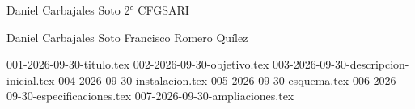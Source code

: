 \documentclass[spanish,openany]{report}
\date{\today}
\begin{document}
{Daniel Carbajales Soto}
{2° CFGSARI}
\setcounter{page}{1}

{Daniel Carbajales Soto}
{Francisco Romero Quílez}

{001-2026-09-30-titulo.tex}
{002-2026-09-30-objetivo.tex}
{003-2026-09-30-descripcion-inicial.tex}
{004-2026-09-30-instalacion.tex}
{005-2026-09-30-esquema.tex}
{006-2026-09-30-especificaciones.tex}
{007-2026-09-30-ampliaciones.tex}

\mbox{}\label{Last Page}
\end{document}
